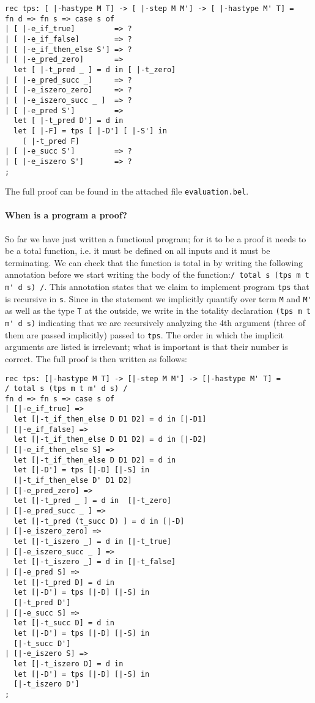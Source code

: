 \begin{lstlisting}
rec tps: [ |-hastype M T] -> [ |-step M M'] -> [ |-hastype M' T] =
fn d => fn s => case s of
| [ |-e_if_true]         => ?
| [ |-e_if_false]        => ?
| [ |-e_if_then_else S'] => ?
| [ |-e_pred_zero]       =>
  let [ |-t_pred _ ] = d in [ |-t_zero]
| [ |-e_pred_succ _]     => ?
| [ |-e_iszero_zero]     => ?
| [ |-e_iszero_succ _ ]  => ?
| [ |-e_pred S']         =>
  let [ |-t_pred D'] = d in
  let [ |-F] = tps [ |-D'] [ |-S'] in
    [ |-t_pred F]
| [ |-e_succ S']         => ?
| [ |-e_iszero S']       => ?
;
\end{lstlisting}

The full proof can be found in the attached file \lstinline!evaluation.bel!.

\paragraph{When is a program a proof?} So far we have just written a
functional program; for it to be a proof it needs to be a total
function, i.e. it must be defined on all inputs and it must be
terminating. We can check that the function is total in \beluga by
writing the following annotation before we start writing the body of
the function:\lstinline!/ total s (tps m t m' d s) /!. This
annotation states that we claim to implement program \lstinline!tps! that is
recursive in \lstinline!s!. Since in the statement we implicitly
quantify over term \lstinline!M! and \lstinline!M'! as well as the
type \lstinline!T! at the outside, we write in the totality
declaration \lstinline!(tps m t m' d s)! indicating that we are
recursively analyzing the 4th argument (three of them are passed
implicitly) passed to \lstinline!tps!. The order in which the
implicit arguments are listed is irrelevant; what is important is
that their number is correct.
The full proof is then written as follows:


\begin{lstlisting}
rec tps: [|-hastype M T] -> [|-step M M'] -> [|-hastype M' T] =
/ total s (tps m t m' d s) /
fn d => fn s => case s of
| [|-e_if_true] =>
  let [|-t_if_then_else D D1 D2] = d in [|-D1]
| [|-e_if_false] =>
  let [|-t_if_then_else D D1 D2] = d in [|-D2]
| [|-e_if_then_else S] =>
  let [|-t_if_then_else D D1 D2] = d in
  let [|-D'] = tps [|-D] [|-S] in
  [|-t_if_then_else D' D1 D2]
| [|-e_pred_zero] =>
  let [|-t_pred _ ] = d in  [|-t_zero]
| [|-e_pred_succ _ ] =>
  let [|-t_pred (t_succ D) ] = d in [|-D]
| [|-e_iszero_zero] =>
  let [|-t_iszero _] = d in [|-t_true]
| [|-e_iszero_succ _ ] =>
  let [|-t_iszero _] = d in [|-t_false]
| [|-e_pred S] =>
  let [|-t_pred D] = d in
  let [|-D'] = tps [|-D] [|-S] in
  [|-t_pred D']
| [|-e_succ S] =>
  let [|-t_succ D] = d in
  let [|-D'] = tps [|-D] [|-S] in
  [|-t_succ D']
| [|-e_iszero S] =>
  let [|-t_iszero D] = d in
  let [|-D'] = tps [|-D] [|-S] in
  [|-t_iszero D']
;
\end{lstlisting}


